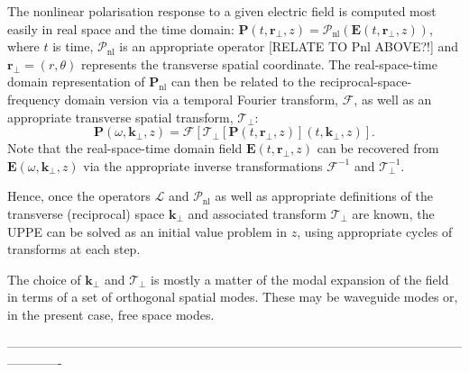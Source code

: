 \documentclass[a4paper]{jpconf}
\begin{document}
The nonlinear polarisation response to a given electric field is computed most easily in real space and the time domain: $\mathbf{P}(t, \mathbf{r}_\perp,z) = \mathcal{P}_\text{nl}(\mathbf{E}(t,\mathbf{r}_\perp,z))$, where $t$ is time, $\mathcal{P}_\text{nl}$ is an appropriate operator [RELATE TO Pnl ABOVE?!] and $\mathbf{r}_\perp = (r, \theta)$ represents the transverse spatial coordinate. The real-space-time domain representation of $\mathbf{P}_\text{nl}$ can then be related to the reciprocal-space-frequency domain version via a temporal Fourier transform, $\mathcal{F}$, as well as an appropriate transverse spatial transform, $\mathcal{T}_\perp$:
\begin{equation}
\mathbf{P}(\omega, \mathbf{k}_\perp,z) = \mathcal{F}\left[ \mathcal{T}_\perp \left[ \mathbf{P}(t, \mathbf{r}_\perp,z) \right](t, \mathbf{k}_\perp, z)  \right]. 
\end{equation}
Note that the real-space-time domain field $\mathbf{E}(t, \mathbf{r}_\perp, z)$ can be recovered from $\mathbf{E}(\omega, \mathbf{k}_\perp, z)$ via the appropriate inverse transformations $\mathcal{F}^{-1}$ and $\mathcal{T}^{-1}_\perp$. \par 

Hence, once the operators $\mathcal{L}$ and $\mathcal{P}_\text{nl}$ as well as appropriate definitions of the transverse (reciprocal) space $\mathbf{k}_\perp$ and associated transform $\mathcal{T}_\perp$ are known, the UPPE can be solved as an initial value problem in $z$, using appropriate cycles of transforms at each step. \par 
The choice of $\mathbf{k}_\perp$ and $\mathcal{T}_\perp$ is mostly a matter of the modal expansion of the field in terms of a set of orthogonal spatial modes. These may be waveguide modes or, in the present case, free space modes. 



-------------------------------------------------------------------------------------------------------------------------
\end{document}
